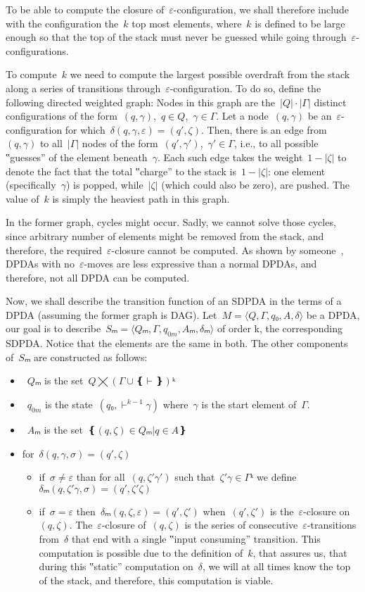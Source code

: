 To be able to compute the closure of~$ε$-configuration, we shall
  therefore include with the configuration the~$k$ top most elements,
  where~$k$ is defined to be large enough so that
  the top of the stack must never be guessed while going
  through~$ε$-configurations.

To compute~$k$ we need to compute the largest possible overdraft
  from the stack along a series of transitions through~$ε$-configuration.
To do so, define the following directed weighted graph:
Nodes in this graph are the~$|Q|·|Γ|$ distinct configurations
  of the form~$(q,γ)$,~$q∈Q$,~$γ∈Γ$.
Let a node~$(q,γ)$ be an~$ε$-configuration for which~$δ(q,γ,ε)=(q',ζ)$.
Then, there is an edge from~$(q,γ)$ to all~$|Γ|$ nodes of the form~$(q',γ')$,~$γ'∈Γ$, i.e.,
  to all possible ‟guesses” of the element beneath~$γ$.
Each such edge takes the weight~$1-|ζ|$ to denote the fact
  that the total ‟charge” to the stack is~$1-|ζ|$:
    one element (specifically~$γ$) is popped,
    while~$|ζ|$ (which could also be zero), are pushed.
The value of~$k$ is simply the heaviest path in this graph.

In the former graph, cycles might occur.
Sadly, we cannot solve those cycles, since arbitrary number of elements might be removed from the
  stack, and therefore, the required~$ε$-closure cannot be computed.
As shown by someone~\cite{Autebert:97}, DPDAs with no~$ε$-moves are less expressive than a normal DPDAs,
  and therefore, not all DPDA can be computed.

Now, we shall describe the transition function of an SDPDA in the terms of a DPDA (assuming the former graph is DAG).
Let~$M=⟨Q,Γ,q₀,A,δ⟩$ be a DPDA, our goal is to describe~$Sₘ=⟨Qₘ,Γ,q_{0m},Aₘ,δₘ⟩$
of order k, the corresponding SDPDA\@.
Notice that the elements are the same in both.
The other components of~$Sₘ$ are constructed as follows:
\begin{itemize}
  \item~$Qₘ$ is the set~$Q⨉\left(Γ∪❴\vdash❵\right)ᵏ$
  \item~$q_{0m}$ is the state~$(q₀,\vdash^{k-1}γ)$ where~$γ$ is the start element of~$Γ$.
  \item~$Aₘ$ is the set~$❴(q,ζ)∈Qₘ | q∈A❵$
  \item for~$δ(q,γ,σ) = (q',ζ)$
        \begin{itemize}
          \item if~$σ≠ε$ than for all~$(q,ζ'γ')$ such that~$ζ'γ∈Γᵏ$ we
            define~$δₘ(q,ζ'γ,σ)=(q',ζ'ζ)$
          \item if~$σ=ε$ then~$δₘ(q,ζ,ε)=(q',ζ')$ when~$(q',ζ')$ is
            the~$ε$-closure on~$(q,ζ)$.  The~$ε$-closure of~$(q,ζ)$ is the
            series of consecutive~$ε$-transitions from~$δ$ that end with a
            single ‟input consuming” transition.  This computation is possible
            due to the definition of~$k$, that assures us, that during this
            ‟static” computation on~$δ$, we will at all times know the top of
            the stack, and therefore, this computation is viable.
        \end{itemize}
\end{itemize}

